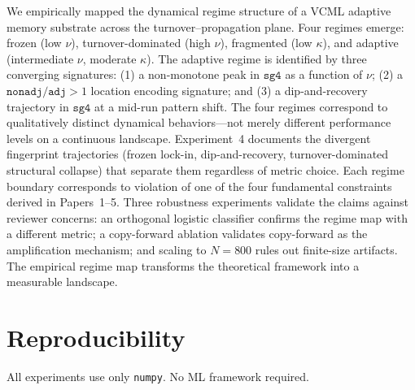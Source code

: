 \documentclass[11pt]{article}
\theoremstyle{remark}
\begin{document}
We empirically mapped the dynamical regime structure of a VCML adaptive memory
substrate across the turnover--propagation plane. Four regimes emerge: frozen
(low $\nu$), turnover-dominated (high $\nu$), fragmented (low $\kappa$), and adaptive
(intermediate $\nu$, moderate $\kappa$). The adaptive regime is identified by
three converging signatures: (1) a non-monotone peak in $\mathtt{sg4}$ as a
function of $\nu$; (2) a $\mathtt{nonadj/adj} > 1$ location encoding signature;
and (3) a dip-and-recovery trajectory in $\mathtt{sg4}$ at a mid-run pattern
shift. The four regimes correspond to qualitatively distinct dynamical behaviors---not
merely different performance levels on a continuous landscape. Experiment~4
documents the divergent fingerprint trajectories (frozen lock-in,
dip-and-recovery, turnover-dominated structural collapse) that separate them
regardless of metric choice. Each regime boundary corresponds to violation of one of the four
fundamental constraints derived in Papers~1--5. Three robustness experiments
validate the claims against reviewer concerns: an orthogonal logistic classifier
confirms the regime map with a different metric; a copy-forward ablation
validates copy-forward as the amplification mechanism; and scaling to $N = 800$ rules out
finite-size artifacts. The empirical regime map transforms the theoretical
framework into a measurable landscape.

\appendix
\section{Reproducibility}

All experiments use only \texttt{numpy}. No ML framework required.
\end{document}
